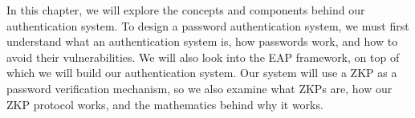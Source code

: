\noindent
In this chapter, we will explore the concepts and components behind our authentication system.
To design a password authentication system, we must first understand what an authentication system is, how passwords work, and how to avoid their vulnerabilities.
We will also look into the EAP framework, on top of which we will build our authentication system.
Our system will use a ZKP as a password verification mechanism, so we also examine what ZKPs are, how our ZKP protocol works, and the mathematics behind why it works.